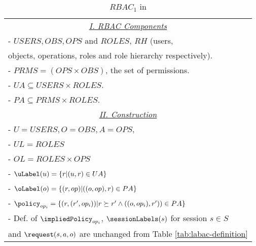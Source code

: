 \begin{table}
	\centering
	\caption{ $RBAC_1$ in \clabac} %
	\label{tab:rbac-in-labac-table}
	\begin{tabular}{|l|}						
		\hline					
		\multicolumn{1}{|c|}{\underline{\textit{I. RBAC Components }}}\\				 
		 -  $USERS, OBS, OPS$ and $ROLES$, $RH$ (users, \\ \hfill objects, operations, roles and role hierarchy respectively). \\
		 -  $PRMS = {(OPS \times OBS)}$, the set of permissions.  \\		 
		 -  $UA \subseteq USERS \times ROLES$.  \\
		 - $PA \subseteq PRMS \times ROLES$. \\
		\multicolumn{1}{|c|}{\underline{\textit{II. Construction}}} \\
		 	-  $U = USERS, O = OBS, A = OPS, $ \\ 	
		 	- $UL=ROLES$ \\	  
		 	- $ OL = ROLES \times OPS$ \\
		 	-  $\uLabel(u) = \{ r | (u,r) \in UA \}$ \\		 	
		 	-  $ \oLabel(o) = \{ (r,op) | ((o,op),r) \in PA \}$\\
		 	-  $\policy_{op_i} = \{ (r, (r',op_i) ) |  r \succeq r' \land ((o,op_i),r')) \in PA  \} $ \\
		 	- Def. of  $\impliedPolicy_{op_i}$,  $\sessionLabels(s)$ for session $s \in S$ \\ \hfill and $\request(s, a, o)$  are unchanged from Table \ref{tab:labac-definition}	\\	
		 	
		 \hline	
	\end{tabular}	

	
\end{table}
